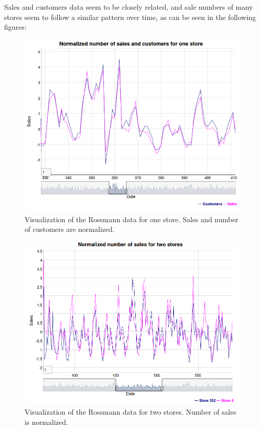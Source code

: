 \documentclass[DIV=calc, paper=a4, fontsize=11pt, twocolumn]{scrartcl}
\begin{document}
	Sales and customers data seem to be closely related, and sale numbers of many stores seem to follow a similar pattern over time, as can be seen in the following figures:
    \begin{figure}[H]
        \centering
        \includegraphics[width=\linewidth]{rossmann_visualization_sales-customers}
        \caption{Visualization of the Rossmann data for one store. Sales and number of customers are normalized.}
        \label{fig:sub1}
        \end{figure}

    \begin{figure}[H]
        \centering
        \includegraphics[width=\linewidth]{rossmann_visualization_two-stores}
        \caption{Visualization of the Rossmann data for two stores. Number of sales is normalized.}
        \label{fig:sub1}
    	\end{figure}
\end{document}
